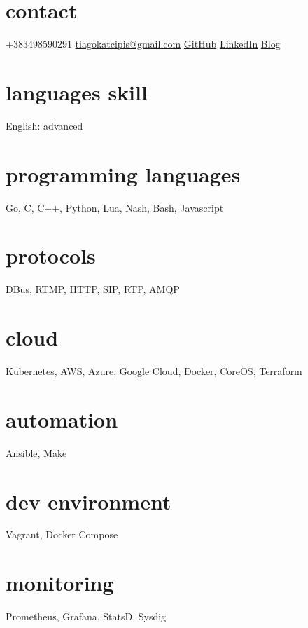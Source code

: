 \documentclass[]{friggeri-cv} %
\begin{document}


\begin{aside} %
\section{contact}
+383498590291
\href{mailto:tiagokatcipis@gmail.com}{tiagokatcipis@gmail.com}
\href{https://github.com/katcipis}{GitHub}
\href{http://www.linkedin.com/pub/tiago-katcipis/1b/273/8b0}{LinkedIn}
\href{http://katcipis.github.io/}{Blog}
\section{languages skill}
English: advanced
\section{programming languages}
Go, C, C++, Python, Lua, Nash, Bash, Javascript
\section{protocols}
DBus, RTMP, HTTP, SIP, RTP, AMQP
\section{cloud}
Kubernetes, AWS, Azure, Google Cloud, Docker, CoreOS, Terraform
\section{automation}
Ansible, Make
\section{dev environment}
Vagrant, Docker Compose
\section{monitoring}
Prometheus, Grafana, StatsD, Sysdig
\end{aside}

\end{document}
